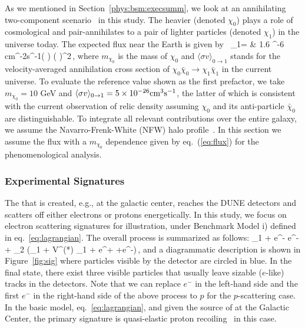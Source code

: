 As we mentioned in Section~\ref{phys:bsm:execsumm}, %
we look at an annihilating two-component  scenario~\cite{Belanger:2011ww} in this study. 
The heavier  (denoted $\chi_0$) plays a role of cosmological  and pair-annihilates to a pair of lighter  particles (denoted $\chi_1$) in the universe today. 
The expected flux near the Earth is given by~\cite{Agashe:2014yua,
Giudice:2017zke, Kim:2018veo}
\bea 
{}_1= & 1.6 ^{-6} {\rm cm}^{-2}{\rm s}^{-1}\times \left( \right) 
 \times \left( \right)^2\,,
\label{eq:flux}
\eea
where $m_{\chi_0}$ is the mass of $\chi_0$ and $\langle \sigma v\rangle_{0\rightarrow 1}$ stands for the velocity-averaged annihilation cross section of $\chi_0\bar{\chi}_0 \to \chi_1\bar{\chi}_1$ in the current universe.
To evaluate the reference value shown as the first prefactor, we take $m_{\chi_0} = 10$ GeV and $\langle \sigma v\rangle_{0\rightarrow 1}=5\times 10^{-26}{\rm cm}^3{\rm s}^{-1}$, the latter of which is consistent with the current observation of  relic density assuming $\chi_0$ and its anti-particle $\bar{\chi}_0$ are distinguishable. 
To integrate all relevant contributions over the entire galaxy, we assume the Navarro-Frenk-White (NFW)  halo profile~\cite{Navarro:1995iw, Navarro:1996gj}.
In this section we assume the  flux with a $m_{\chi_0}$ dependence given by eq.~(\ref{eq:flux}) for the phenomenological analysis. 


\subsubsection{Experimental Signatures}

The  that is created, e.g., at the galactic center, reaches the DUNE  
detectors and scatters off either electrons or protons energetically. 
In this study, we focus on electron scattering signatures for illustration, under Benchmark Model i) defined in eq.~\eqref{eq:lagrangian}. 
The overall process is summarized as follows:
\bea 
\chi_1 + e^- \to e^- + \chi_2 (\to \chi_1 + V^{(*)} \to \chi_1 + e^+ +e^-)\,,
\eea
and a diagrammatic description is shown in Figure~\ref{fig:sig} where %
particles visible by the detector are circled in blue. %
In the final state, there exist three visible particles that usually leave sizable ($e$-like) tracks in the %
detectors.  
Note that we can replace $e^-$ in the left-hand side and the first $e^-$ in the right-hand side of the above process to $p$ for the $p$-scattering case.
In the basic model, eq.~\eqref{eq:lagrangian}, and given the source of  at the Galactic Center,  the primary signature is quasi-elastic proton recoiling~\cite{pscattering} in this case.

